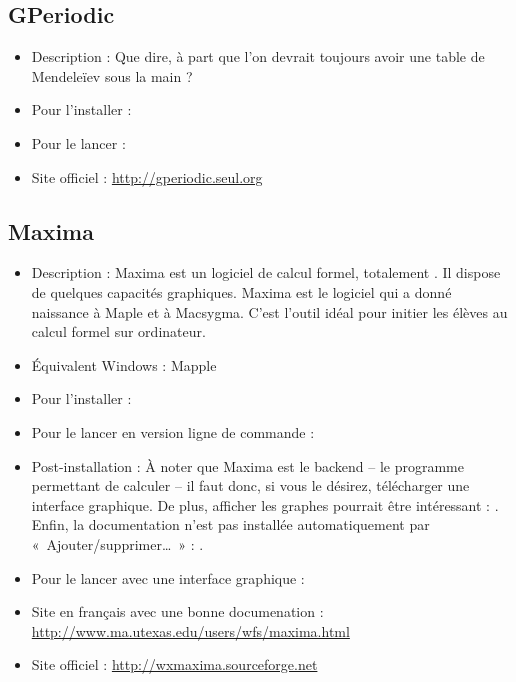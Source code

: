 \subsection{GPeriodic}
\begin{itemize}
\begingroup
{}
\item Description : Que dire, à part que l'on devrait toujours avoir une table de Mendeleïev sous la main ?{\par}
\item Pour l'installer : 
\item Pour le lancer : 
\item Site officiel : \url{http://gperiodic.seul.org}{\par}
\endgroup
\end{itemize}

\subsection{Maxima}
\begin{itemize}
\begingroup
{}
\item Description : Maxima est un logiciel de calcul formel, totalement . Il dispose de quelques capacités graphiques. Maxima est le logiciel qui a donné naissance à Maple et à Macsygma. C'est l'outil idéal pour initier les élèves au calcul formel sur ordinateur.{\par}
\item Équivalent Windows : Mapple{\par}
\item Pour l'installer : 
\item Pour le lancer en version ligne de commande : 
\endgroup
\item Post-installation : À noter que Maxima est le backend -- le programme permettant de calculer -- il faut donc, si vous le désirez, télécharger une interface graphique. De plus, afficher les graphes pourrait être intéressant : . Enfin, la documentation n'est pas installée automatiquement par «~Ajouter/supprimer\dots{}~» : .{\par}
\item Pour le lancer avec une interface graphique : 
\item Site en français avec une bonne documenation : \url{http://www.ma.utexas.edu/users/wfs/maxima.html}{\par}
\item Site officiel : \url{http://wxmaxima.sourceforge.net}{\par}
\end{itemize}
